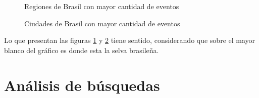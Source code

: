 \documentclass[a4paper]{article}
\begin{document}
\begin{figure}[h!]
	\caption{Regiones de Brasil con mayor cantidad de eventos}
	\label{fig:regionsbrasil}
\end{figure}

\begin{figure}[h!]
	\caption{Ciudades de Brasil con mayor cantidad de eventos}
	\label{fig:citybrasil}
\end{figure}

Lo que presentan las figuras \ref{fig:regionsbrasil} y \ref{fig:citybrasil} tiene sentido, considerando que sobre el mayor blanco del gráfico es donde esta la selva brasileña.

\section{Análisis de búsquedas} \label{busq}
\end{document}

